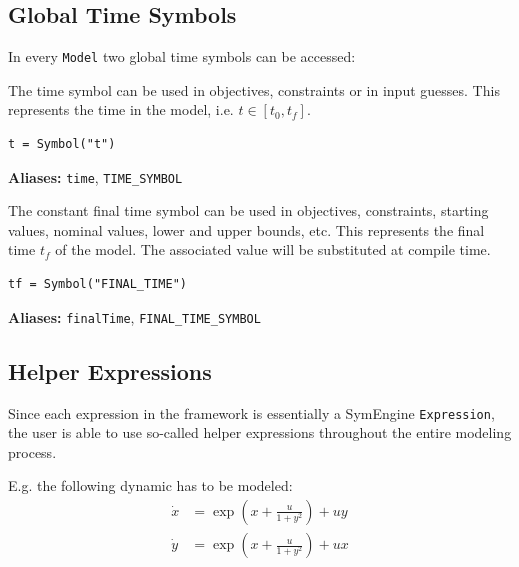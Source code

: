 \documentclass[12pt]{article}
\begin{document}
\subsection{Global Time Symbols}
\label{c:globaltime}
In every \texttt{Model} two global time symbols can be accessed:

\begin{mdframed}[backgroundcolor=gray!10, roundcorner=10pt,
		linewidth=1pt]

	The time symbol can be used in objectives, constraints or in
	input guesses. This represents the time in the model, i.e. $t \in [t_0,
			t_f]$.

	\begin{lstlisting}
t = Symbol("t")
		\end{lstlisting}
	\label{timeSymbol}

	\textbf{Aliases:} \texttt{time}, \texttt{TIME\_SYMBOL}
\end{mdframed}

\begin{mdframed}[backgroundcolor=gray!10, roundcorner=10pt,
		linewidth=1pt]

	The constant final time symbol can be used in objectives,
	constraints, starting values, nominal values, lower and upper bounds,
	etc.
	This represents the final time $t_f$ of the model. The
	associated value will be substituted at compile time.

	\begin{lstlisting}
tf = Symbol("FINAL_TIME")
		\end{lstlisting}
	\label{finalTimeSymbol}

	\textbf{Aliases:} \texttt{finalTime},
	\texttt{FINAL\_TIME\_SYMBOL}
\end{mdframed}

\subsection{Helper Expressions}

Since each expression in the framework is essentially a SymEngine
\texttt{Expression}, the user is able to use so-called helper expressions
throughout the entire modeling process.

E.g. the following dynamic has to be modeled:
\begin{align*}
	\dot{x} & = \exp\left(x + \frac{u}{1 + y^2}\right) + u y \\
	\dot{y} & = \exp\left(x + \frac{u}{1 + y^2}\right) + u x
\end{align*}
\end{document}
